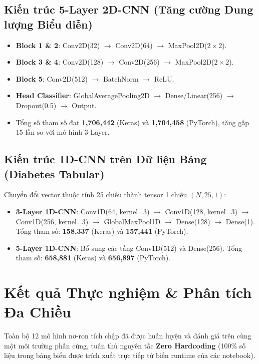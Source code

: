 \documentclass[12pt,a4paper]{report}
\begin{document}
\section{Kiến trúc 5-Layer 2D-CNN (Tăng cường Dung lượng Biểu diễn)}
\begin{itemize}
    \item \textbf{Block 1 \& 2}: Conv2D(32) $\to$ Conv2D(64) $\to$ MaxPool2D($2 \times 2$).
    \item \textbf{Block 3 \& 4}: Conv2D(128) $\to$ Conv2D(256) $\to$ MaxPool2D($2 \times 2$).
    \item \textbf{Block 5}: Conv2D(512) $\to$ BatchNorm $\to$ ReLU.
    \item \textbf{Head Classifier}: GlobalAveragePooling2D $\to$ Dense/Linear(256) $\to$ Dropout(0.5) $\to$ Output.
    \item Tổng số tham số đạt \textbf{1,706,442} (Keras) và \textbf{1,704,458} (PyTorch), tăng gấp 15 lần so với mô hình 3-Layer.
\end{itemize}

\section{Kiến trúc 1D-CNN trên Dữ liệu Bảng (Diabetes Tabular)}
Chuyển đổi vector thuộc tính 25 chiều thành tensor 1 chiều $(N, 25, 1)$:
\begin{itemize}
    \item \textbf{3-Layer 1D-CNN}: Conv1D(64, kernel=3) $\to$ Conv1D(128, kernel=3) $\to$ Conv1D(256, kernel=3) $\to$ GlobalMaxPool1D $\to$ Dense(128) $\to$ Dense(1). Tổng tham số: \textbf{158,337} (Keras) và \textbf{157,441} (PyTorch).
    \item \textbf{5-Layer 1D-CNN}: Bổ sung các tầng Conv1D(512) và Dense(256). Tổng tham số: \textbf{658,881} (Keras) và \textbf{656,897} (PyTorch).
\end{itemize}

\chapter{Kết quả Thực nghiệm \& Phân tích Đa Chiều}

Toàn bộ 12 mô hình nơ-ron tích chập đã được huấn luyện và đánh giá trên cùng một môi trường phần cứng, tuân thủ nguyên tắc \textbf{Zero Hardcoding} (100\% số liệu trong bảng biểu được trích xuất trực tiếp từ biến runtime của các notebook).
\end{document}
